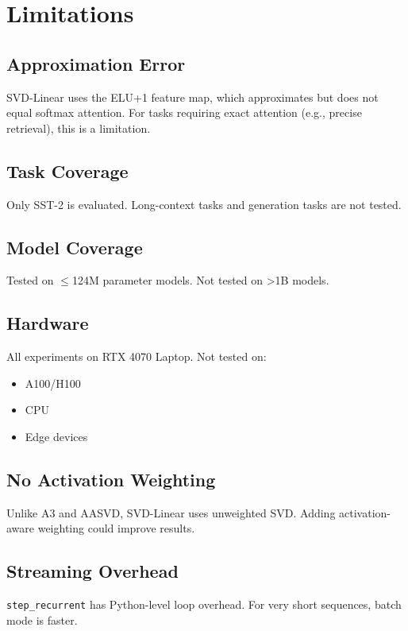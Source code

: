 
\section{Limitations}

\subsection{Approximation Error}

SVD-Linear uses the ELU+1 feature map, which approximates but does not equal 
softmax attention. For tasks requiring exact attention (e.g., precise 
retrieval), this is a limitation.

\subsection{Task Coverage}

Only SST-2 is evaluated. Long-context tasks and generation tasks are not 
tested.

\subsection{Model Coverage}

Tested on $\le$124M parameter models. Not tested on >1B models.

\subsection{Hardware}

All experiments on RTX 4070 Laptop. Not tested on:
\begin{itemize}
\item A100/H100
\item CPU
\item Edge devices

\end{itemize}
\subsection{No Activation Weighting}

Unlike A3 and AASVD, SVD-Linear uses unweighted SVD. Adding activation-aware 
weighting could improve results.

\subsection{Streaming Overhead}

\texttt{step\_recurrent} has Python-level loop overhead. For very short sequences, 
batch mode is faster.

